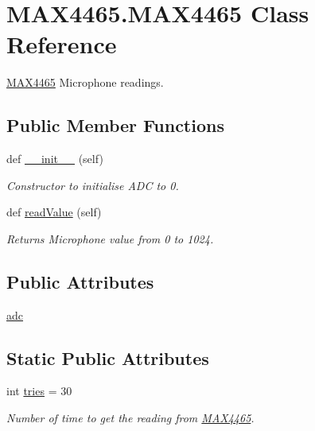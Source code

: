 \hypertarget{class_m_a_x4465_1_1_m_a_x4465}{}\section{M\+A\+X4465.\+M\+A\+X4465 Class Reference}
\label{class_m_a_x4465_1_1_m_a_x4465}


\mbox{\hyperlink{class_m_a_x4465_1_1_m_a_x4465}{M\+A\+X4465}} Microphone readings.  


\subsection*{Public Member Functions}
\begin{DoxyCompactItemize}
\item 
def \mbox{\hyperlink{class_m_a_x4465_1_1_m_a_x4465_ac0254870231e3847e7196165da339454}{\+\_\+\+\_\+init\+\_\+\+\_\+}} (self)
\begin{DoxyCompactList}\small\item\em Constructor to initialise A\+DC to 0. \end{DoxyCompactList}\item 
def \mbox{\hyperlink{class_m_a_x4465_1_1_m_a_x4465_a4c2fdc1d03b59856b1767625ae559f4e}{read\+Value}} (self)
\begin{DoxyCompactList}\small\item\em Returns Microphone value from 0 to 1024. \end{DoxyCompactList}\end{DoxyCompactItemize}
\subsection*{Public Attributes}
\begin{DoxyCompactItemize}
\item 
\mbox{\hyperlink{class_m_a_x4465_1_1_m_a_x4465_a3105c3a48d58a789f43392b02dcca53a}{adc}}
\end{DoxyCompactItemize}
\subsection*{Static Public Attributes}
\begin{DoxyCompactItemize}
\item 
int \mbox{\hyperlink{class_m_a_x4465_1_1_m_a_x4465_a20f477b4c08ab04441833485453d3fc9}{tries}} = 30
\begin{DoxyCompactList}\small\item\em Number of time to get the reading from \mbox{\hyperlink{class_m_a_x4465_1_1_m_a_x4465}{M\+A\+X4465}}. \end{DoxyCompactList}\end{DoxyCompactItemize}


